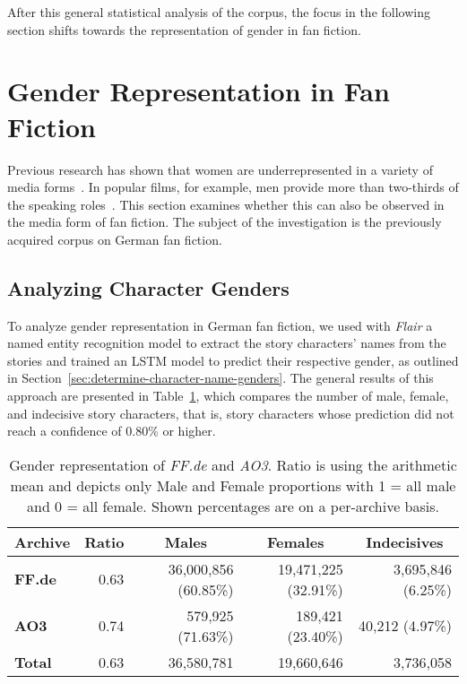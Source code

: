 After this general statistical analysis of the corpus, the focus in the following section shifts towards the representation of gender in fan fiction.


\section{Gender Representation in Fan Fiction}\label{sec:gender-representation-in-fan-fiction}

Previous research has shown that women are underrepresented in a variety of media forms~\citep{Collins2011ContentGo}.
In popular films, for example, men provide more than two-thirds of the speaking roles~\citep{Neville2019FewerFilms}.
This section examines whether this can also be observed in the media form of fan fiction.
The subject of the investigation is the previously acquired corpus on German fan fiction.

\subsection{Analyzing Character Genders}\label{subsec:analyzing-character-genders}

To analyze gender representation in German fan fiction, we used with \emph{Flair}\citep{Akbik2019FLAIR:NLP} a named entity recognition model to extract the story characters' names from the stories and trained an LSTM model to predict their respective gender, as outlined in Section~\ref{sec:determine-character-name-genders}.
The general results of this approach are presented in Table~\ref{tab:gender-representation}, which compares the number of male, female, and indecisive story characters, that is, story characters whose prediction did not reach a confidence of 0.80\% or higher.

\begin{table}[htb]
    \renewcommand{\arraystretch}{1.5}
    \centering
    \begin{tabular}{lrrrr}
        \toprule
        \textbf{Archive} &
        \multicolumn{1}{c}{\textbf{Ratio}} &
        \multicolumn{1}{c}{\textbf{Males}} &
        \multicolumn{1}{c}{\textbf{Females}} &
        \multicolumn{1}{c}{\textbf{Indecisives}} \\
        \midrule
        \textbf{FF.de} & 0.63 & 36,000,856 (60.85\%) & 19,471,225 (32.91\%) & 3,695,846 (6.25\%) \\
        \textbf{AO3}   & 0.74 & 579,925 (71.63\%)    & 189,421 (23.40\%)    & 40,212 (4.97\%)    \\
        \midrule
        \textbf{Total} & 0.63 & 36,580,781           & 19,660,646           & 3,736,058          \\
        \bottomrule
    \end{tabular}
    \caption[Gender representation of \emph{FF.de} and \emph{AO3}.]{Gender representation of \emph{FF.de} and \emph{AO3}.
    Ratio is using the arithmetic mean and depicts only Male and Female proportions with 1 = all male and 0 = all female.
    Shown percentages are on a per-archive basis.}
    \label{tab:gender-representation}
\end{table}

